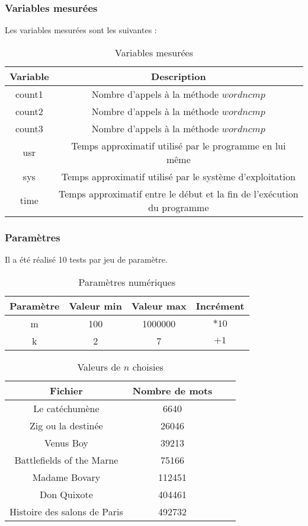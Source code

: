 \subsubsection{Variables mesurées}

Les variables mesurées sont les suivantes :

\begin{table}[h!]
	\centering
	\caption{Variables mesurées}
	\label{tab:variablesMesureesExperience}
	\begin{tabular}{c|c}
		\toprule
		Variable & Description\\
		\midrule
		count1 & Nombre d'appels à la méthode $wordncmp$\\
		count2 & Nombre d'appels à la méthode $wordncmp$\\
		count3 & Nombre d'appels à la méthode $wordncmp$\\
		usr & Temps approximatif utilisé par le programme en lui même\\
		sys & Temps approximatif utilisé par le système d'exploitation\\
		time & Temps approximatif entre le début et la fin de l'exécution du programme\\
		\bottomrule
	\end{tabular}
\end{table}

\subsubsection{Paramètres}
Il a été réalisé 10 tests par jeu de paramètre.

\begin{table}[h!]
	\centering
	\caption{Paramètres numériques}
	\label{tab:parametresNumeriquesRealisee}
	\begin{tabular}{c|ccc}
		\toprule
		Paramètre & Valeur min & Valeur max & Incrément\\
		\midrule
		m & 100 & 1000000 & $*10$\\
		k & 2 & 7 & $+1$\\
		\bottomrule
	\end{tabular}
\end{table}

\begin{table}[h!]
	\centering
	\caption{Valeurs de $n$ choisies}
	\label{tab:valeursDeNChoisiesRealisee}
	\begin{tabular}{c|ccc}
		\toprule
		Fichier & Nombre de mots\\
		\midrule
		Le catéchumène & 6640\\
		Zig ou la destinée & 26046\\
		Venus Boy & 39213\\
		Battlefields of the Marne & 75166\\
		Madame Bovary & 112451\\
		Don Quixote & 404461\\
		Histoire des salons de Paris & 492732\\
		\bottomrule
	\end{tabular}
\end{table}


